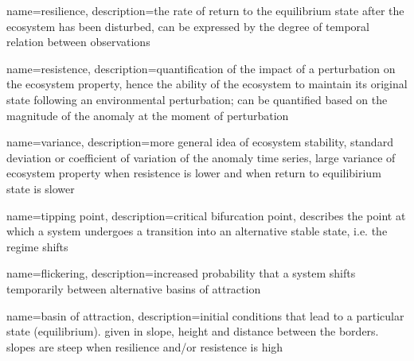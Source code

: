 {
    name=resilience,
    description={the rate of return to the equilibrium state after the ecosystem has been disturbed, can be expressed by the degree of temporal relation between observations \citep{telesca2006, telesca2008, zaccarelli2013, dakos2012}}
}

{
    name=resistence,
    description={quantification of the impact of a perturbation on the ecosystem property, hence the ability of the ecosystem to maintain its original state following an environmental perturbation; can be quantified based on the magnitude of the anomaly at the moment of perturbation \citep{lloret2007, vanruijven2010, vogel2012}}
}

{
    name=variance,
    description={more general idea of ecosystem stability, standard deviation or coefficient of variation of the anomaly time series, large variance of ecosystem property when resistence is lower and when return to equilibirium state is slower \citep{pimm1984, tilman1994, telesca2006, lloret2007, vogel2012}}
}

{
    name=tipping point,
    description={critical bifurcation point, describes the point at which a system undergoes a transition into an alternative stable state, i.e. the regime shifts \citep{scheffer2001}}
}

{
    name=flickering,
    description={increased probability that a system shifts temporarily between alternative basins of attraction \citep{dakos2012}}
}


{
    name=basin of attraction,
    description={initial conditions that lead to a particular state (equilibrium). given in slope, height and distance between the borders. slopes are steep when resilience and/or resistence is high \citep{scheffer2001}}
}
